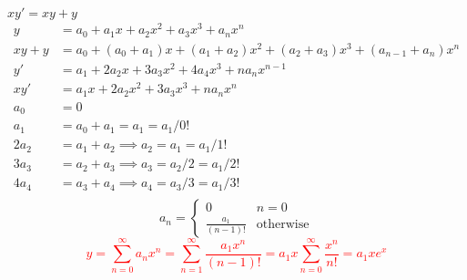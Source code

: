 \item $xy'=xy+y$
\begin{align*}
    y &= a_0 + a_1x + a_2x^2 + a_3x^3 + a_nx^n\\
    xy + y &= a_0 + (a_0 + a_1)x + (a_1 + a_2)x^2 + (a_2 + a_3)x^3 + (a_{n-1} + a_n)x^n \\
    y' &= a_1 + 2a_2x + 3a_3x^2 + 4a_4x^3 + na_nx^{n-1} \\
    xy' &= a_1x + 2a_2x^2 + 3a_3x^3 + na_nx^n \\
    a_0 &= 0 \\
    a_1 &= a_0 + a_1 = a_1 = a_1/0!\\
    2a_2 &= a_1 + a_2 \implies a_2 = a_1 = a_1/1!\\
    3a_3 &= a_2 + a_3 \implies a_3 = a_2/2 = a_1/2!\\
    4a_4 &= a_3 + a_4 \implies a_4 = a_3/3 = a_1/3!\\
\end{align*}
\[
a_n = 
\begin{cases}
    0 & n = 0\\
    \frac{a_1}{(n-1)!} & \text{otherwise}
\end{cases}
\]
\textcolor{red}{\[
    y 
    = \sum_{n=0}^\infty a_nx^n
    = \sum_{n=1}^\infty \frac{a_1x^n}{(n-1)!} 
    = a_1x\sum_{n=0}^\infty \frac{x^n}{n!} 
    = a_1xe^x
\]}
